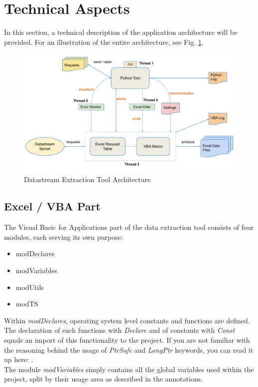 \section{Technical Aspects} \label{appendix:technical-aspects}
In this section, a technical description of the application architecture will be provided. For an illustration of the entire architecture, see Fig. \ref{fig:ds-extraction-tool-arch}. 
\begin{figure}[h]
	\centering
	\includegraphics[width=1.1\linewidth]{figures/ds-extraction-tool-architecture}
	\caption{Datastream Extraction Tool Architecture}
	\label{fig:ds-extraction-tool-arch}
\end{figure}

\subsection{Excel / VBA Part}
The Visual Basic for Applications part of the data extraction tool consists of four modules, each serving its own purpose: 
\begin{itemize}
	\item modDeclares
	\item modVariables
	\item modUtils
	\item modTS
\end{itemize}
Within \textit{modDeclares}, operating system level constants and functions are defined. The declaration of such functions with \textit{Declare} and of constants with \textit{Const} equals an import of this functionality to the project. If you are not familiar with the reasoning behind the usage of \textit{PtrSafe} and \textit{LongPtr} keywords, you can read it up here: \cite{ptrsafe, longptr}.  \\ 

The module \textit{modVariables} simply contains all the global variables used within the project, split by their usage area as described in the annotations. \\

